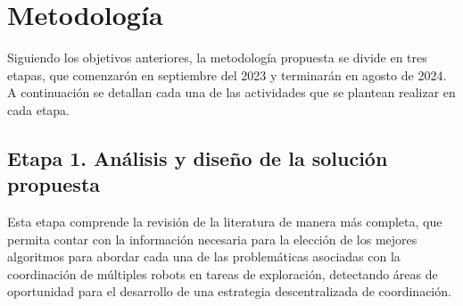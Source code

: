 \documentclass[sigconf]{acmart}
\begin{document}
\section{Metodología}

Siguiendo los objetivos anteriores, la metodolog\'{i}a propuesta se divide en tres etapas, que comenzarón en septiembre del 2023 y terminarán en agosto de 2024. A continuaci\'{o}n se detallan cada una de las actividades que se plantean realizar en cada etapa.

\subsection*{Etapa 1. An\'{a}lisis y dise\~{n}o de la soluci\'{o}n propuesta}

Esta etapa comprende la revisi\'{o}n de la literatura de manera m\'{a}s completa, que permita contar con la informaci\'{o}n necesaria para la elecci\'{o}n de los mejores algoritmos para abordar cada una de las problem\'{a}ticas asociadas con la coordinaci\'{o}n de múltiples robots en tareas de exploración, detectando áreas de oportunidad para el desarrollo de una estrategia descentralizada de coordinación. %

  
  
\end{document}
